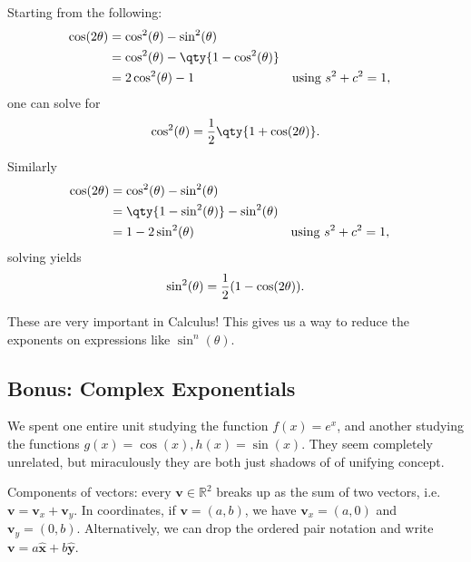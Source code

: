\begin{corollary}[?]

Starting from the following:
\begin{align*}
\cos(2\theta) 
&= \cos^2(\theta) - \sin^2(\theta) \\
&= \cos^2(\theta) - \qty{1 - \cos^2(\theta) } \\
&= 2\cos^2(\theta) -1 && \text{using } s^2 + c^2 = 1
,\end{align*}
one can solve for
\begin{align*}
\cos^2(\theta) = {1\over 2}\qty{1 + \cos(2\theta) }
.\end{align*}

Similarly
\begin{align*}
\cos(2\theta) 
&= \cos^2(\theta) - \sin^2(\theta) \\
&= \qty{1 - \sin^2(\theta) } - \sin^2(\theta) \\
&= 1-2\sin^2(\theta) && \text{using } s^2 + c^2 = 1
,\end{align*}
solving yields
\begin{align*}
\sin^2(\theta) = {1\over 2} (1 - \cos(2\theta) )
.\end{align*}

\end{corollary}

\begin{remark}

These are very important in Calculus! This gives us a way to reduce the
exponents on expressions like \(\sin^n(\theta)\).

\end{remark}

\hypertarget{bonus-complex-exponentials}{%
\subsection{Bonus: Complex
Exponentials}\label{bonus-complex-exponentials}}

\begin{question}

We spent one entire unit studying the function \(f(x) = e^x\), and
another studying the functions \(g(x) = \cos(x), h(x) = \sin(x)\). They
seem completely unrelated, but miraculously they are both just shadows
of of unifying concept.

\end{question}

\begin{remark}

Components of vectors: every \(\mathbf{v}\in {\mathbb{R}}^2\) breaks up
as the sum of two vectors,
i.e.~\(\mathbf{v} = \mathbf{v}_x + \mathbf{v}_y\). In coordinates, if
\(\mathbf{v} = (a, b)\), we have \(\mathbf{v}_x = (a, 0)\) and
\(\mathbf{v}_y = (0, b)\). Alternatively, we can drop the ordered pair
notation and write
\(\mathbf{v} = a \widehat{\mathbf{x}} + b \widehat{\mathbf{y}}\).

\end{remark}

